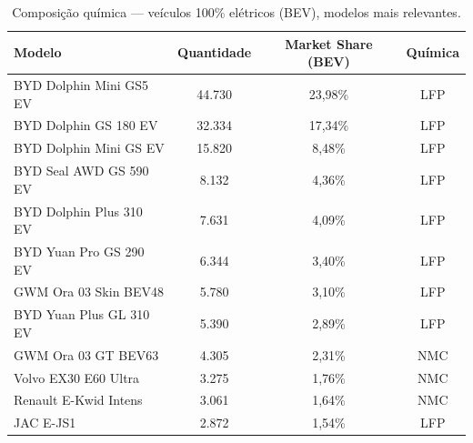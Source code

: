 \begin{table}[H]
\centering
\caption{Composição química — veículos 100\% elétricos (BEV), modelos mais
         relevantes.}
\label{tab:bev}
\begin{tabular}{lccc}
\toprule
\textbf{Modelo} & \textbf{Quantidade} & \textbf{Market Share (BEV)} & \textbf{Química} \\
\midrule
BYD Dolphin Mini GS5 EV  & 44.730 & 23,98\% & LFP \\
BYD Dolphin GS 180 EV    & 32.334 & 17,34\% & LFP \\
BYD Dolphin Mini GS EV   & 15.820 &  8,48\% & LFP \\
BYD Seal AWD GS 590 EV   &  8.132 &  4,36\% & LFP \\
BYD Dolphin Plus 310 EV  &  7.631 &  4,09\% & LFP \\
BYD Yuan Pro GS 290 EV   &  6.344 &  3,40\% & LFP \\
GWM Ora 03 Skin BEV48    &  5.780 &  3,10\% & LFP \\
BYD Yuan Plus GL 310 EV  &  5.390 &  2,89\% & LFP \\
GWM Ora 03 GT BEV63      &  4.305 &  2,31\% & NMC \\
Volvo EX30 E60 Ultra     &  3.275 &  1,76\% & NMC \\
Renault E-Kwid Intens    &  3.061 &  1,64\% & NMC \\
JAC E-JS1                &  2.872 &  1,54\% & LFP \\
\bottomrule
\end{tabular}
\end{table}

